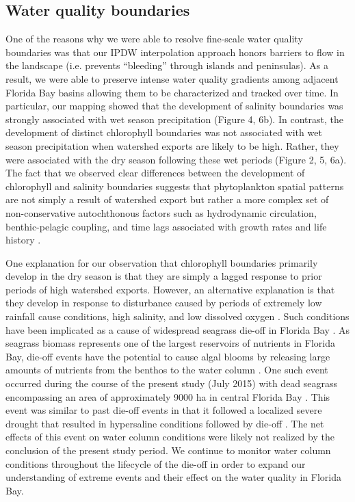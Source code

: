 \documentclass[review]{elsarticle}
\begin{document}
\subsection{Water quality boundaries}

One of the reasons why we were able to resolve fine-scale water quality boundaries was that our IPDW interpolation approach honors barriers to flow in the landscape (i.e. prevents “bleeding” through islands and peninsulas). As a result, we were able to preserve intense water quality gradients among adjacent Florida Bay basins allowing them to be characterized and tracked over time. In particular, our mapping showed that the development of salinity boundaries was strongly associated with wet season precipitation (Figure 4, 6b). In contrast, the development of distinct chlorophyll boundaries was not associated with wet season precipitation when watershed exports are likely to be high. Rather, they were associated with the dry season following these wet periods (Figure 2, 5, 6a). The fact that we observed clear differences between the development of chlorophyll and salinity boundaries suggests that phytoplankton spatial patterns are not simply a result of watershed export but rather a more complex set of non-conservative autochthonous factors such as hydrodynamic circulation, benthic-pelagic coupling, and time lags associated with growth rates and life history .

One explanation for our observation that chlorophyll boundaries primarily develop in the dry season is that they are simply a lagged response to prior periods of high watershed exports. However, an alternative explanation is that they develop in response to disturbance caused by periods of extremely low rainfall cause conditions, high salinity, and low dissolved oxygen . Such conditions have been implicated as a cause of widespread seagrass die-off in Florida Bay . As seagrass biomass represents one of the largest reservoirs of nutrients in Florida Bay, die-off events have the potential to cause algal blooms by releasing large amounts of nutrients from the benthos to the water column . One such event occurred during the course of the present study (July 2015) with dead seagrass encompassing an area of approximately 9000 ha in central Florida Bay . This event was similar to past die-off events in that it followed a localized severe drought that resulted in hypersaline conditions followed by die-off . The net effects of this event on water column conditions were likely not realized by the conclusion of the present study period. We continue to monitor water column conditions throughout the lifecycle of the die-off in order to expand our understanding of extreme events and their effect on the water quality in Florida Bay.
\end{document}
